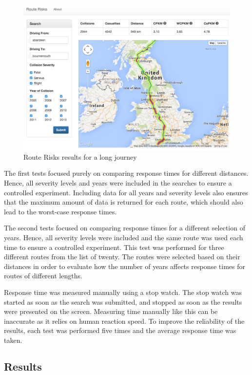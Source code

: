 \documentclass[authoryearcitations]{UoYCSproject}
\begin{document}
\begin{figure}
	\center
	\includegraphics[scale=0.45]{routeriskslongdist}
	\caption{Route Risks results for a long journey}
	\label{fig:routeriskslong}
\end{figure}

The first tests focused purely on comparing response times for different distances. Hence, all severity levels and years were included in the searches to ensure a controlled experiment. Including data for all years and severity levels also ensures that the maximum amount of data is returned for each route, which should also lead to the worst-case response times. 

The second tests focused on comparing response times for a different selection of years. Hence, all severity levels were included and the same route was used each time to ensure a controlled experiment. This test was performed for three different routes from the list of twenty. The routes were selected based on their distances in order to evaluate how the number of years affects response times for routes of different lengths.

Response time was measured manually using a stop watch. The stop watch was started as soon as the search was submitted, and stopped as soon as the results were presented on the screen. Measuring time manually like this can be inaccurate as it relies on human reaction speed. To improve the reliability of the results, each test was performed five times and the average response time was taken.

\subsection{Results}
\end{document}
